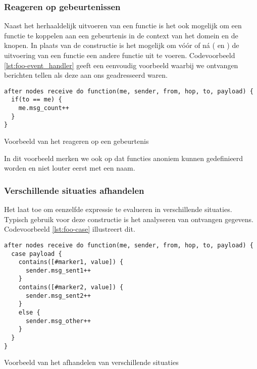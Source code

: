 \vspace{-3mm}

\subsubsection{Reageren op gebeurtenissen}

Naast het herhaaldelijk uitvoeren van een functie is het ook mogelijk om een
functie te koppelen aan een gebeurtenis in de context van het domein en de
knopen. In plaats van de  constructie is het mogelijk om
v\'o\'or of n\'a ( en ) de uitvoering van een functie
een andere functie uit te voeren. Codevoorbeeld \ref{lst:foo-event_handler}
geeft een eenvoudig voorbeeld waarbij we ontvangen berichten tellen als deze
aan ons geadresseerd waren.

\begin{listing}[ht]
  \begin{verbatim}
after nodes receive do function(me, sender, from, hop, to, payload) {
  if(to == me) {
    me.msg_count++
  }
}
  \end{verbatim}
  \vspace{-5mm}
  \caption{Voorbeeld van het reageren op een gebeurtenis}
  \label{lst:foo-event_handler}
\end{listing}

In dit voorbeeld merken we ook op dat functies anoniem kunnen gedefinieerd
worden en niet louter eerst met een naam.

\vspace{-3mm}

\subsubsection{Verschillende situaties afhandelen}

Het  laat toe om eenzelfde expressie te evalueren in
verschillende situaties. Typisch gebruik voor deze constructie is het
analyseren van ontvangen gegevens. Codevoorbeeld \ref{lst:foo-case} illustreert dit.

\begin{listing}[ht]
  \begin{verbatim}
after nodes receive do function(me, sender, from, hop, to, payload) {
  case payload {
    contains([#marker1, value]) {
      sender.msg_sent1++
    }
    contains([#marker2, value]) {
      sender.msg_sent2++
    }
    else {
      sender.msg_other++
    }
  }
}
  \end{verbatim}
  \vspace{-5mm}
  \caption{Voorbeeld van het afhandelen van verschillende situaties}
  \label{lst:foo-case}
\end{listing}

